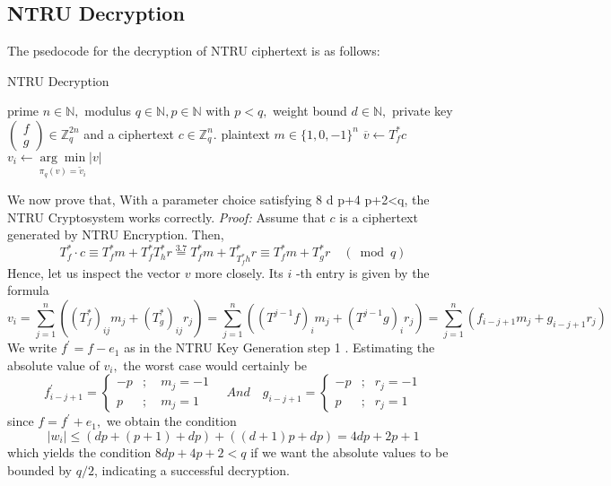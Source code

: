 \subsection{NTRU Decryption}
The psedocode for the decryption of NTRU ciphertext is as follows:
\begin{algorithm}[h]
        \caption{NTRU Decryption}
        \begin{algorithmic}[1] %
            \Require prime $n \in \mathbb{N},$ modulus $q \in \mathbb{N}, p \in \mathbb{N}$ with $p<q,$ weight bound $d \in \mathbb{N},$ private key $\left(\begin{array}{l}{f} \\ {g}\end{array}\right) \in \mathbb{Z}_{q}^{2 n}$ and a ciphertext $c \in \mathbb{Z}_{q}^{n}$.
            \Ensure plaintext $m \in\{1,0,-1\}^{n}$
            \State $\overline{v} \leftarrow T_{f}^{*} c$
                \State $v_{i} \leftarrow \underset{\pi_{q}(v)=\tilde{v}_{i}}{\arg \min }|v|$
             \EndFor
             \State {}  
        \end{algorithmic}
    \end{algorithm} 
    \newpage
We now prove that, With a parameter choice satisfying 8 d p+4 p+2<q, the NTRU Cryptosystem works correctly.
\newline
\emph{Proof: } Assume that $c$ is a ciphertext generated by NTRU Encryption. Then,\newline
\begin{equation}
    T_{f}^{*} \cdot c \equiv T_{f}^{*} m+T_{f}^{*} T_{h}^{*} r \stackrel{3.7}{=} T_{f}^{*} m+T_{T_{f}^{*}h}^{*} r \equiv T_{f}^{*} m+T_{g}^{*} r \quad(\bmod q)
\end{equation}
Hence, let us inspect the vector $v$ more closely. Its $i$ -th entry is given by the formula\newline
\begin{equation}
    v_{i}=\sum_{j=1}^{n}\left(\left(T_{f}^{*}\right)_{i j} m_{j}+\left(T_{g}^{*}\right)_{i j} r_{j}\right)=\sum_{j=1}^{n}\left(\left(T^{j-1} f\right)_{i} m_{j}+\left(T^{j-1} g\right)_{i} r_{j}\right) = \sum_{j=1}^{n}\left(f_{i-j+1} m_{j}+g_{i-j+1} r_{j}\right)
\end{equation}
We write $f^{\prime}=f-e_{1}$ as in the NTRU Key Generation step 1 . Estimating the absolute value of $v_{i},$ the worst case would certainly be
\begin{equation}
    f_{i-j+1}^{\prime}=\left\{\begin{aligned}-p & { ;} \quad m_{j}=-1 \\ p & { ;} \quad m_{j}=1 \end{aligned}\right.\quad And\quad g_{i-j+1}=\left\{\begin{array}{rlr}{-p} & { ;} & {r_{j}=-1} \\ {p} & { ;} & {r_{j} = 1}\end{array}\right.
\end{equation}
since $f=f^{\prime}+e_{1},$ we obtain the condition 
\begin{equation}
    \left|w_{i}\right| \leq(d p+(p+1)+d p)+((d+1) p+d p)=4 d p+2 p+1
\end{equation}
which yields the condition $8 d p+4 p+2<q$ if we want the absolute values to be bounded by $q / 2$, indicating a successful decryption.